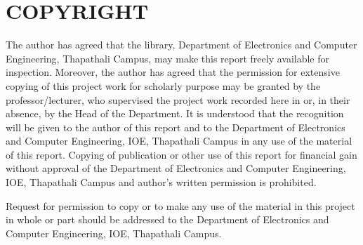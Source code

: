 \chapter*{COPYRIGHT}
{}

The author has agreed that the library, Department of Electronics and Computer Engineering, Thapathali Campus, may make this report freely available for inspection. Moreover, the author has agreed that the permission for extensive copying of this project work for scholarly purpose may be granted by the professor/lecturer, who supervised the project work recorded here in or, in their absence, by the Head of the Department. It is understood that the recognition will be given to the author of this report and to the Department of Electronics and Computer Engineering, IOE, Thapathali Campus in any use of the material of this report. Copying of publication or other use of this report for financial gain without approval of the Department of Electronics and Computer Engineering, IOE, Thapathali Campus and author's written permission is prohibited. 

Request for permission to copy or to make any use of the material in this project in whole or part should be addressed to the Department of Electronics and Computer
Engineering, IOE, Thapathali Campus.
